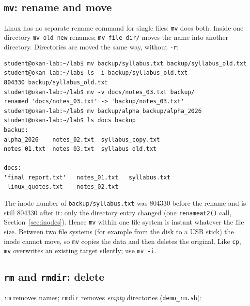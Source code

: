 \documentclass[11pt,a4paper]{article}
\newcommand{\cmd}[1]{\texttt{#1}}
\begin{document}
\subsection{\texttt{mv}: rename and move}

Linux has no separate rename command for single files: \cmd{mv} does both. Inside one directory \cmd{mv old new} renames; \cmd{mv file dir/} moves the name into another directory. Directories are moved the same way, without \cmd{-r}:

\begin{lstlisting}[style=term]
student@okan-lab:~/lab$ mv backup/syllabus.txt backup/syllabus_old.txt
student@okan-lab:~/lab$ ls -i backup/syllabus_old.txt
804330 backup/syllabus_old.txt
student@okan-lab:~/lab$ mv -v docs/notes_03.txt backup/
renamed 'docs/notes_03.txt' -> 'backup/notes_03.txt'
student@okan-lab:~/lab$ mv backup/alpha backup/alpha_2026
student@okan-lab:~/lab$ ls docs backup
backup:
alpha_2026    notes_02.txt  syllabus_copy.txt
notes_01.txt  notes_03.txt  syllabus_old.txt

docs:
'final report.txt'   notes_01.txt   syllabus.txt
 linux_quotes.txt    notes_02.txt
\end{lstlisting}

The inode number of \texttt{backup/syllabus.txt} was $804330$ before the rename and is still $804330$ after it: only the directory entry changed (one \cmd{renameat2()} call, Section~\ref{sec:inodes}). Hence \cmd{mv} within one file system is instant whatever the file size. Between two file systems (for example from the disk to a USB stick) the inode cannot move, so \cmd{mv} copies the data and then deletes the original. Like \cmd{cp}, \cmd{mv} overwrites an existing target silently; use \cmd{mv -i}.

\subsection{\texttt{rm} and \texttt{rmdir}: delete}

\cmd{rm} removes names; \cmd{rmdir} removes \emph{empty} directories (\cmd{demo\_rm.sh}):
\end{document}
